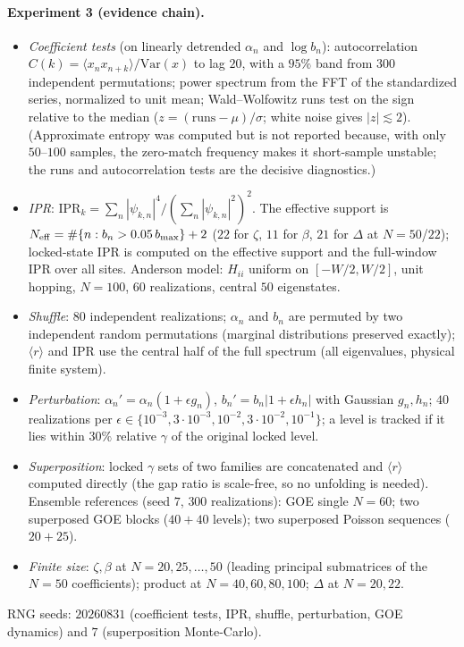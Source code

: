 \documentclass[aps,prx,reprint,floatfix]{revtex4-2}
\begin{document}
\paragraph{Experiment 3 (evidence chain).}
\begin{itemize}[leftmargin=1.4em]
\item \emph{Coefficient tests} (on linearly detrended $\alpha_n$ and
$\log b_n$): autocorrelation $C(k)=\langle x_n x_{n+k}\rangle/\mathrm{Var}(x)$
to lag $20$, with a $95\%$ band from $300$ independent permutations;
power spectrum from the FFT of the standardized series, normalized to unit
mean; Wald--Wolfowitz runs test on the sign relative to the median
($z=(\text{runs}-\mu)/\sigma$; white noise gives $|z|\lesssim2$).
(Approximate entropy was computed but is not reported because, with only
$50$--$100$ samples, the zero-match frequency makes it short-sample
unstable; the runs and autocorrelation tests are the decisive
diagnostics.)
\item \emph{IPR}: $\mathrm{IPR}_k=\sum_n|\psi_{k,n}|^4/(\sum_n|\psi_{k,n}|^2)^2$.
The effective support is $N_{\rm eff}=\#\{n:b_n>0.05\,b_{\max}\}+2$
($22$ for $\zeta$, $11$ for $\beta$, $21$ for $\Delta$ at $N=50$/$22$);
locked-state IPR is computed on the effective support and the full-window
IPR over all sites. Anderson model: $H_{ii}$ uniform on $[-W/2,W/2]$,
unit hopping, $N=100$, $60$ realizations, central $50$ eigenstates.
\item \emph{Shuffle}: $80$ independent realizations; $\alpha_n$ and $b_n$
are permuted by two independent random permutations (marginal distributions
preserved exactly); $\langle r\rangle$ and IPR use the central half of the
full spectrum (all eigenvalues, physical finite system).
\item \emph{Perturbation}: $\alpha_n'=\alpha_n(1+\epsilon g_n)$,
$b_n'=b_n|1+\epsilon h_n|$ with Gaussian $g_n,h_n$; $40$ realizations per
$\epsilon\in\{10^{-3},3\cdot10^{-3},10^{-2},3\cdot10^{-2},10^{-1}\}$; a
level is tracked if it lies within $30\%$ relative $\gamma$ of the original
locked level.
\item \emph{Superposition}: locked $\gamma$ sets of two families are
concatenated and $\langle r\rangle$ computed directly (the gap ratio is
scale-free, so no unfolding is needed). Ensemble references (seed $7$,
$300$ realizations): GOE single $N=60$; two superposed GOE blocks
($40+40$ levels); two superposed Poisson sequences ($20+25$).
\item \emph{Finite size}: $\zeta,\beta$ at $N=20,25,\ldots,50$ (leading
principal submatrices of the $N=50$ coefficients); product at
$N=40,60,80,100$; $\Delta$ at $N=20,22$.
\end{itemize}
RNG seeds: $20260831$ (coefficient tests, IPR, shuffle, perturbation,
GOE dynamics) and $7$ (superposition Monte-Carlo).
\end{document}
